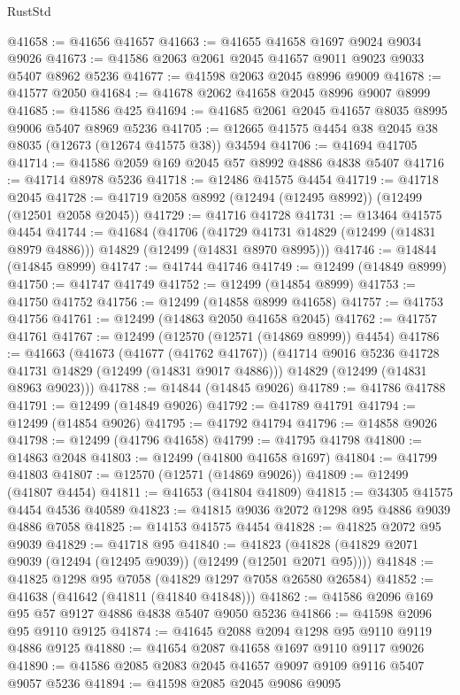 \begin{lexlean}{RustStd}
\begin{coremodule}
@41658 := @41656 @41657
@41663 := @41655 @41658 @1697 @9024 @9034 @9026
@41673 := @41586 @2063 @2061 @2045 @41657 @9011 @9023 @9033 @5407 @8962 @5236
@41677 := @41598 @2063 @2045 @8996 @9009
@41678 := @41577 @2050
@41684 := @41678 @2062 @41658 @2045 @8996 @9007 @8999
@41685 := @41586 @425
@41694 := @41685 @2061 @2045 @41657 @8035 @8995 @9006 @5407 @8969 @5236
@41705 := @12665 @41575 @4454 @38 @2045 @38 @8035 (@12673 (@12674 @41575 @38)) @34594
@41706 := @41694 @41705
@41714 := @41586 @2059 @169 @2045 @57 @8992 @4886 @4838 @5407
@41716 := @41714 @8978 @5236
@41718 := @12486 @41575 @4454
@41719 := @41718 @2045
@41728 := @41719 @2058 @8992 (@12494 (@12495 @8992)) (@12499 (@12501 @2058 @2045))
@41729 := @41716 @41728
@41731 := @13464 @41575 @4454
@41744 := @41684
    (@41706
      (@41729 @41731 @14829 (@12499 (@14831 @8979 @4886)))
      @14829
      (@12499 (@14831 @8970 @8995)))
@41746 := @14844 (@14845 @8999)
@41747 := @41744 @41746
@41749 := @12499 (@14849 @8999)
@41750 := @41747 @41749
@41752 := @12499 (@14854 @8999)
@41753 := @41750 @41752
@41756 := @12499 (@14858 @8999 @41658)
@41757 := @41753 @41756
@41761 := @12499 (@14863 @2050 @41658 @2045)
@41762 := @41757 @41761
@41767 := @12499 (@12570 (@12571 (@14869 @8999)) @4454)
@41786 := @41663
    (@41673
      (@41677 (@41762 @41767))
      (@41714 @9016 @5236 @41728 @41731 @14829 (@12499 (@14831 @9017 @4886)))
      @14829
      (@12499 (@14831 @8963 @9023)))
@41788 := @14844 (@14845 @9026)
@41789 := @41786 @41788
@41791 := @12499 (@14849 @9026)
@41792 := @41789 @41791
@41794 := @12499 (@14854 @9026)
@41795 := @41792 @41794
@41796 := @14858 @9026
@41798 := @12499 (@41796 @41658)
@41799 := @41795 @41798
@41800 := @14863 @2048
@41803 := @12499 (@41800 @41658 @1697)
@41804 := @41799 @41803
@41807 := @12570 (@12571 (@14869 @9026))
@41809 := @12499 (@41807 @4454)
@41811 := @41653 (@41804 @41809)
@41815 := @34305 @41575 @4454 @4536 @40589
@41823 := @41815 @9036 @2072 @1298 @95 @4886 @9039 @4886 @7058
@41825 := @14153 @41575 @4454
@41828 := @41825 @2072 @95 @9039
@41829 := @41718 @95
@41840 := @41823 (@41828 (@41829 @2071 @9039 (@12494 (@12495 @9039)) (@12499 (@12501 @2071 @95))))
@41848 := @41825 @1298 @95 @7058 (@41829 @1297 @7058 @26580 @26584)
@41852 := @41638 (@41642 (@41811 (@41840 @41848)))
@41862 := @41586 @2096 @169 @95 @57 @9127 @4886 @4838 @5407 @9050 @5236
@41866 := @41598 @2096 @95 @9110 @9125
@41874 := @41645 @2088 @2094 @1298 @95 @9110 @9119 @4886 @9125
@41880 := @41654 @2087 @41658 @1697 @9110 @9117 @9026
@41890 := @41586 @2085 @2083 @2045 @41657 @9097 @9109 @9116 @5407 @9057 @5236
@41894 := @41598 @2085 @2045 @9086 @9095

\end{coremodule}
\end{lexlean}
